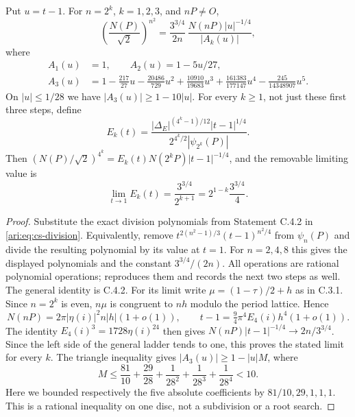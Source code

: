 \begin{proposition}\label{ari:C.8.4}
Put $u=t-1$. For $n=2^k$, $k=1,2,3$, and $nP\ne O$,
\begin{equation}\label{ari:eq:ca-ladder}
 \left(\frac{N(P)}{\sqrt2}\right)^{n^2}
 =\frac{3^{3/4}}{2n}\,
       \frac{N(nP)|u|^{-1/4}}{|A_k(u)|},
\end{equation}
where
\begin{align*}
 A_1(u)&=1,\qquad A_2(u)=1-5u/27,\\
 A_3(u)&=1-\frac{217}{27}u-\frac{20486}{729}u^2
       +\frac{10910}{19683}u^3
       +\frac{161383}{177147}u^4
       -\frac{245}{14348907}u^5.
\end{align*}
On $|u|\le1/28$ we have $|A_3(u)|\ge1-10|u|$.
For every $k\ge1$, not just these first three steps, define
\[
 E_k(t)=\frac{|\Delta_E|^{(4^k-1)/12}|t-1|^{1/4}}
 {2^{4^k/2}|\psi_{2^k}(P)|}.
\]
Then $(N(P)/\sqrt2)^{4^k}=E_k(t)N(2^kP)|t-1|^{-1/4}$,
and the removable limiting value is
\[
 \lim_{t\to1}E_k(t)=\frac{3^{3/4}}{2^{k+1}}
                 =2^{1-k}\frac{3^{3/4}}4.
\]
\end{proposition}
\begin{proof}
Substitute the exact division polynomials from Statement C.4.2
in \eqref{ari:eq:cs-division}. Equivalently, remove
$t^{2(n^2-1)/3}(t-1)^{n^2/4}$ from $\psi_n(P)$ and divide
the resulting polynomial by its value at $t=1$. For $n=2,4,8$
this gives the displayed polynomials and the constant
$3^{3/4}/(2n)$. All operations are rational polynomial operations;
 reproduces them and records
the next two steps as well. The general identity is C.4.2.
For its limit write $\mu=(1-\tau)/2+h$ as in C.3.1. Since
$n=2^k$ is even, $n\mu$ is congruent to $nh$ modulo the
period lattice. Hence
\[
 N(nP)=2\pi|\eta(i)|^2 n|h|(1+o(1)),\qquad
 t-1=\tfrac94\pi^4E_4(i)h^4(1+o(1)).
\]
The identity $E_4(i)^3=1728\eta(i)^{24}$ then gives
$N(nP)|t-1|^{-1/4}\to2n/3^{3/4}$.
Since the left side of the general ladder tends to one,
this proves the stated limit for every $k$.
The triangle inequality gives
$|A_3(u)|\ge1-|u|M$, where
\[
 M\le\frac{81}{10}+\frac{29}{28}
                +\frac1{28^2}+\frac1{28^3}+\frac1{28^4}<10.
\]
Here we bounded respectively the five absolute coefficients by
$81/10,29,1,1,1$. This is a rational inequality on one disc,
not a subdivision or a root search.
\end{proof}

